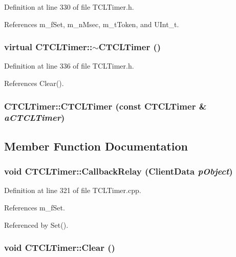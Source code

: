 Definition at line 330 of file TCLTimer.h.

References m\_\-f\-Set, m\_\-n\-Msec, m\_\-t\-Token, and UInt\_\-t.
\subsubsection{\setlength{\rightskip}{0pt plus 5cm}virtual CTCLTimer::$\sim$CTCLTimer ()\hspace{0.3cm}{\tt  [inline, virtual]}}\label{classCTCLTimer_a2}




Definition at line 336 of file TCLTimer.h.

References Clear().
\subsubsection{\setlength{\rightskip}{0pt plus 5cm}CTCLTimer::CTCLTimer (const CTCLTimer \& {\em a\-CTCLTimer})\hspace{0.3cm}{\tt  [private]}}\label{classCTCLTimer_c0}




\subsection{Member Function Documentation}
\subsubsection{\setlength{\rightskip}{0pt plus 5cm}void CTCLTimer::Callback\-Relay (Client\-Data {\em p\-Object})\hspace{0.3cm}{\tt  [static]}}\label{classCTCLTimer_d0}




Definition at line 321 of file TCLTimer.cpp.

References m\_\-f\-Set.

Referenced by Set().
\subsubsection{\setlength{\rightskip}{0pt plus 5cm}void CTCLTimer::Clear ()}\label{classCTCLTimer_a9}




